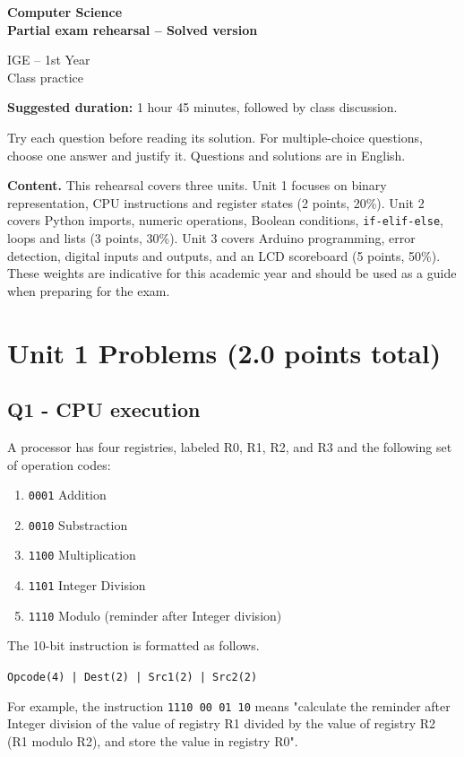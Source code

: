 \documentclass[10pt]{article}
\let\OldSection\section
\renewcommand{\section}{\clearpage\OldSection}
\begin{document}
\begin{center}
{\LARGE\bfseries Computer Science\\Partial exam rehearsal -- Solved version\par}
\vspace{1em}
IGE -- 1st Year\\Class practice
\end{center}
\textbf{Suggested duration:} 1 hour 45 minutes, followed by class discussion.

Try each question before reading its solution. For multiple-choice questions, choose one answer and justify it. Questions and solutions are in English.

\textbf{Content.} This rehearsal covers three units. Unit 1 focuses on binary representation, CPU instructions and register states (2 points, 20\%). Unit 2 covers Python imports, numeric operations, Boolean conditions, \texttt{if-elif-else}, loops and lists (3 points, 30\%). Unit 3 covers Arduino programming, error detection, digital inputs and outputs, and an LCD scoreboard (5 points, 50\%). These weights are indicative for this academic year and should be used as a guide when preparing for the exam.

\section*{Unit 1 Problems (2.0 points total)}

\subsection*{Q1 - CPU execution}
A processor has four registries, labeled R0, R1, R2, and R3 and the following set of operation codes: 
\begin{enumerate}
    \item \texttt{0001} Addition
    \item \texttt{0010} Substraction
    \item \texttt{1100} Multiplication
    \item \texttt{1101} Integer Division
    \item \texttt{1110} Modulo (reminder after Integer division)
\end{enumerate}
The 10-bit instruction is formatted as follows. 

\texttt{Opcode(4) | Dest(2) | Src1(2) | Src2(2)}

For example, the instruction \texttt{1110 00 01 10} means "calculate the reminder after Integer division of the value of registry R1 divided by the value of registry R2 (R1 modulo R2), and store the value in registry R0".
\end{document}
